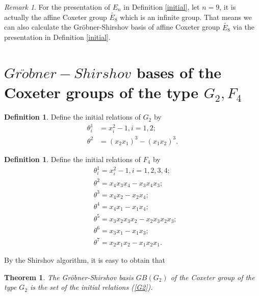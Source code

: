 \documentclass[UTF8]{amsart}
\newtheorem{theorem}[tpcl]{Theorem}
\theoremstyle{definition}
\newtheorem{definition}[tpcl]{Definition}
\theoremstyle{remark}
\newtheorem{remark}[tpcl]{Remark}
\numberwithin{equation}{section}
\begin{document}
\begin{remark}
For the presentation of $E_n$ in Definition \ref{initial}, let $n=9$, it is actually the affine Coxeter group $\widetilde{E_8}$ which is an infinite group.  That means we can also  calculate the  Gr\"{o}bner-Shirshov basis of affine Coxeter group $\widetilde{E_8}$ via  the presentation in Definition \ref{initial}.
\end{remark}

\appendix
\section{ $Gr\ddot{o}bner-Shirshov$ bases  of the Coxeter groups of the type  $G_2,F_4$}\label{GF}
\begin{definition}
  Define the initial relations of $G_2$ by
\begin{equation}\label{G2}
\begin{aligned}
	\theta_i^1&=x_i^2-1, i=1,2;\\
	\theta^2&=(x_2x_1)^3-(x_1x_2)^3.
\end{aligned}
\end{equation}
\end{definition}
\begin{definition}
Define the initial relations of $F_4$ by
\begin{equation}\label{F4}
\begin{aligned}
	&\theta_i^1=x_i^2-1,i=1,2,3,4;\\
	&\theta^2=x_4x_3x_4-x_3x_4x_3;\\
	&\theta^3=x_4x_2-x_2x_4;\\
	&\theta^4=x_4x_1-x_1x_4;\\
	&\theta^5=x_3x_2x_3x_2-x_2x_3x_2x_3;\\
	&\theta^6=x_3x_1-x_1x_3;\\
	&\theta^7=x_2x_1x_2-x_1x_2x_1.
\end{aligned}
\end{equation}
\end{definition}
By the Shirshov algorithm, it is easy to obtain that
\begin{theorem}
The Gr\"{o}bner-Shirshov basis $GB(G_2)$ of the Coxeter group of the type $G_2$ is the set of the initial relations (\ref{G2}).
\end{theorem}
\end{document}
